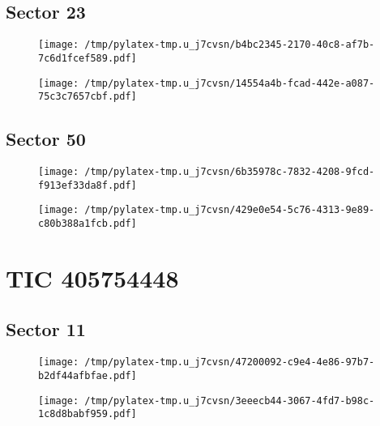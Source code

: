 \documentclass{report}%
\begin{document}
\subsection{Sector 23}%
\label{subsec:36812916423}%


\begin{figure}[H]%
\centering%
\centering%
\texttt{[image: /tmp/pylatex-tmp.u\_j7cvsn/b4bc2345-2170-40c8-af7b-7c6d1fcef589.pdf]}%
\end{figure}

%


\begin{figure}[H]%
\centering%
\texttt{[image: /tmp/pylatex-tmp.u\_j7cvsn/14554a4b-fcad-442e-a087-75c3c7657cbf.pdf]}%
\end{figure}

%
\subsection{Sector 50}%
\label{subsec:36812916450}%


\begin{figure}[H]%
\centering%
\centering%
\texttt{[image: /tmp/pylatex-tmp.u\_j7cvsn/6b35978c-7832-4208-9fcd-f913ef33da8f.pdf]}%
\end{figure}

%


\begin{figure}[H]%
\centering%
\texttt{[image: /tmp/pylatex-tmp.u\_j7cvsn/429e0e54-5c76-4313-9e89-c80b388a1fcb.pdf]}%
\end{figure}

%
\section{TIC 405754448}%
\label{sec:TIC405754448}%
\subsection{Sector 11}%
\label{subsec:40575444811}%


\begin{figure}[H]%
\centering%
\centering%
\texttt{[image: /tmp/pylatex-tmp.u\_j7cvsn/47200092-c9e4-4e86-97b7-b2df44afbfae.pdf]}%
\end{figure}

%


\begin{figure}[H]%
\centering%
\texttt{[image: /tmp/pylatex-tmp.u\_j7cvsn/3eeecb44-3067-4fd7-b98c-1c8d8babf959.pdf]}%
\end{figure}
\end{document}
